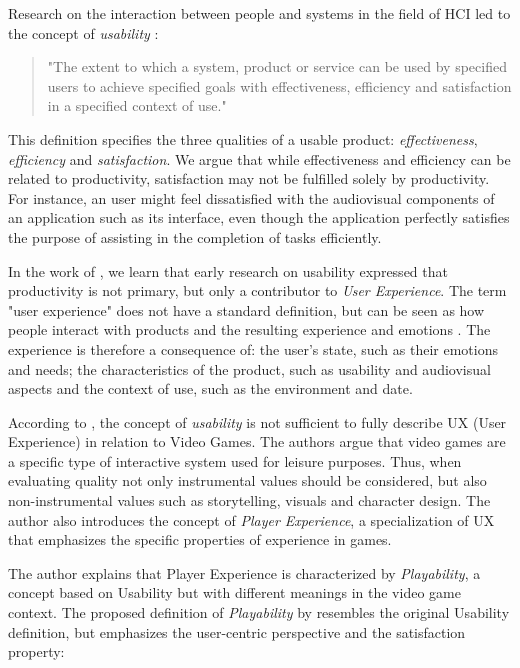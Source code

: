 Research on the interaction between people and systems in the field of HCI led to the concept of \emph{usability} \cite{ISO_ISO92411}:

\begin{quotation}
"The extent to which a system, product or service can be used by specified users to achieve specified goals with effectiveness, efficiency and satisfaction in a specified context of use."
\end{quotation}

This definition specifies the three qualities of a usable product: \emph{effectiveness}, \emph{efficiency} and \emph{satisfaction}. We argue that while effectiveness and efficiency can be related to productivity,  satisfaction may not be fulfilled solely by productivity. For instance, an user might feel dissatisfied with the audiovisual components of an application such as its interface, even though the application perfectly satisfies the purpose of assisting in the completion of tasks efficiently.

In the work of \citet{ARTICLE_UserExperienceAResearchAgenda}, we learn that early research on usability expressed that productivity is not primary, but only a contributor to \emph{User Experience}. The term "user experience" does not have a standard definition, but can be seen as how people interact with products and the resulting experience and emotions \cite{ARTICLE_UnderstandingExperience}. The experience is therefore a consequence of: the user's state, such as their emotions and needs; the characteristics of the product, such as usability and audiovisual aspects and the context of use, such as the environment and date.

According to \citet{ARTICLE_FromUsabilityToPlayability}, the concept of \emph{usability} is not sufficient to fully describe UX (User Experience) in relation to Video Games. The authors argue that video games are a specific type of interactive system used for leisure purposes. Thus, when evaluating quality not only instrumental values should be considered, but also non-instrumental values such as storytelling, visuals and character design. The author also introduces the concept of \emph{Player Experience}, a specialization of UX that emphasizes the specific properties of experience in games.

The author explains that Player Experience is characterized by \emph{Playability}, a concept based on Usability but with different meanings in the video game context. The proposed definition of \emph{Playability} by \citet{ARTICLE_FromUsabilityToPlayability} resembles the original Usability definition, but emphasizes the user-centric perspective and the satisfaction property:

